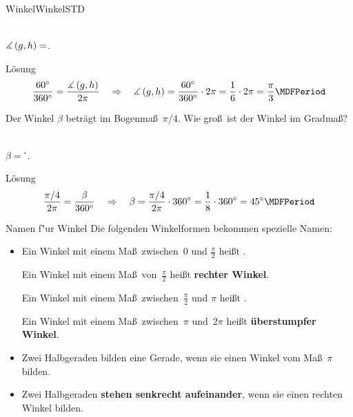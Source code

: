 \begin{MXContent}{Winkel}{Winkel}{STD}
\begin{MExercise}
\ \\
$\measuredangle\left(g, h\right)=$.
\ \\
\begin{MHint}{L\"osung}
\[\frac{60^\circ}{360^\circ}=\frac{\Mmeasuredangle\left(g, h\right)}{2\pi} \quad\Rightarrow\quad \Mmeasuredangle\left(g, h\right)=\frac{60^\circ}{360^\circ}\cdot 2\pi=\frac{1}{6}\cdot 2\pi=\frac{\pi}{3}\MDFPeriod\]
\end{MHint}

\end{MExercise}

\begin{MExercise}
Der Winkel $\beta$ betr\"agt im Bogenma\ss\ $\pi/4$. Wie gro\ss\ ist der Winkel im Gradma\ss ?

\ \\
$\beta=$$^\circ$.
\ \\
\begin{MHint}{L\"osung}
\[\frac{\pi/4}{2\pi}=\frac{\beta}{360^\circ}\quad\Rightarrow\quad \beta=\frac{\pi/4}{2\pi}\cdot 360^\circ=\frac{1}{8}\cdot 360^\circ=45^\circ \MDFPeriod\]
\end{MHint}
\end{MExercise}

\begin{MXInfo}{Namen f"ur Winkel}%
Die folgenden Winkelformen bekommen spezielle Namen:
\begin{itemize}
\item
Ein Winkel mit einem Ma\ss\ zwischen~$0$ und $\frac{\pi}{2}$ hei\ss t .
       
Ein Winkel mit einem Ma\ss\ von~$\frac{\pi}{2}$ hei\ss t \textbf{rechter Winkel}.
       
Ein Winkel mit einem Ma\ss\ zwischen~$\frac{\pi}{2}$ und $\pi$ hei\ss t .
       
Ein Winkel mit einem Ma\ss\ zwischen~$\pi$ und~$2 \pi$ hei\ss t \textbf{\"uberstumpfer Winkel}.

 \item Zwei Halbgeraden bilden eine Gerade, wenn sie einen Winkel vom Ma\ss~$\pi$ bilden.
 
 \item Zwei Halbgeraden \textbf{stehen senkrecht aufeinander}, wenn sie einen rechten Winkel bilden.
\end{itemize}
\end{MXInfo}



\end{MXContent}
